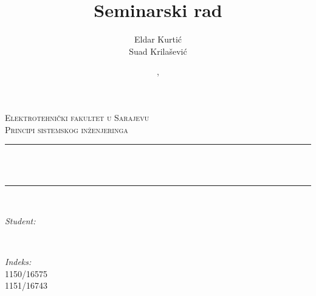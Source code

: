 \documentclass[12pt]{article}
\title{Seminarski rad}                             				%
\author{Eldar Kurtić\\Suad Krilašević}                               %
\date{\MONTH, \the\year}                                           %
\makeatletter
\newcommand{\kurs}{Principi sistemskog inženjeringa}
\newcommand{\indeks}{1150/16575 \\ 1151/16743}
\let\thetitle\@title
\let\theauthor\@author
\let\thedate\@date
\makeatother
\begin{document}

\begin{titlepage}
    \centering
    \vspace*{0.5 cm}
    \textsc{\LARGE Elektrotehnički fakultet u Sarajevu}\\[2.0 cm]   
    \textsc{\Large \kurs}\\[0.5 cm]               
    \rule{\linewidth}{0.2 mm} \\[0.4 cm]%
    { \huge \bfseries \thetitle}\\
    \rule{\linewidth}{0.2 mm} \\[1.5 cm]%
    \vfill
    \begin{minipage}{0.4\textwidth}
        \begin{flushleft} \large
            \emph{Student:}\\
            \theauthor
            \end{flushleft}
            \end{minipage}~
            \begin{minipage}{0.4\textwidth}
            \begin{flushright} \large
            \emph{Indeks:} \\
            \indeks                                   
        \end{flushright}
    \end{minipage}\\[2 cm]
    
    {\large \thedate}\\[2 cm]

    
\end{titlepage}


\tableofcontents
\pagebreak



\end{document}
